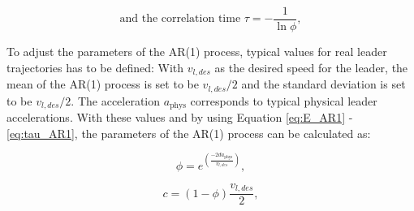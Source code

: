 \documentclass[review]{elsarticle}
\providecommand{\sub}[1]{_{\mathrm{#1}}}  %
\providecommand{\3}{{\ss}}
\begin{document}
\begin{equation}
\label{eq:tau_AR1}
\text{and the correlation time  }\tau = -\frac{1}{\ln \phi}, 
\end{equation}
 
To adjust the parameters of the AR(1) process, typical values for real leader trajectories has to be defined: With $v_{l,des}$ as the desired speed for the leader, the mean of the AR(1) process is set to be $v_{l,des}/2$ and the standard deviation is set to be $v_{l,des}/2$. The acceleration $a\sub{phys}$ corresponds to typical physical leader accelerations. With these values and by using Equation \eqref{eq:E_AR1} - \eqref{eq:tau_AR1}, the parameters of the AR(1) process can be calculated as:

\begin{equation}
\phi = e^{(\frac{-2da\sub{phys}}{v_{l,des}})},
\end{equation}

\begin{equation}
c=(1-\phi)\frac{v_{l,des}}{2},
\end{equation}
\end{document}
